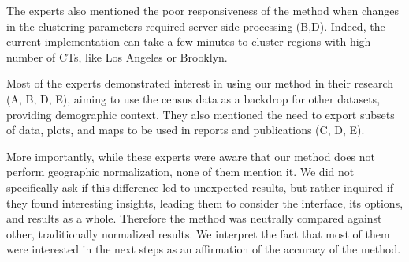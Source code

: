 The experts also mentioned the poor responsiveness of the method when changes in
the clustering parameters required server-side processing (B,D). Indeed, the
current implementation can take a few minutes to cluster regions with high
number of CTs, like Los Angeles or Brooklyn.

Most of the experts demonstrated interest in using our method in their research
(A, B, D, E), aiming to use the census data as a backdrop for other datasets,
providing demographic context. They also mentioned the need to export subsets of
data, plots, and maps to be used in reports and publications (C, D, E).


More importantly, while these experts were aware that our method does not
perform geographic normalization, none of them mention it. We did not
specifically ask if this difference led to unexpected results, but rather
inquired if they found interesting insights, leading them to consider the
interface, its options, and results as a whole. Therefore the method was
neutrally compared against other, traditionally normalized results. We interpret
the fact that most of them were interested in the next steps as an affirmation
of the accuracy of the method.